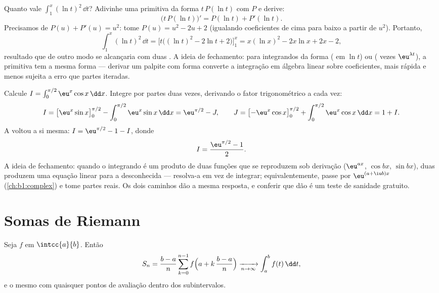 \begin{example}\label{ex:b1:integration:guessdiff}
Quanto vale $\int_1^x (\ln t)^2\,\dd t$? Adivinhe uma primitiva da
forma $t\,P(\ln t)$ com $P$  e derive:
\[
\bigl(t\,P(\ln t)\bigr)' = P(\ln t) + P'(\ln t) .
\]
Precisamos de $P(u) + P'(u) = u^2$: tome $P(u) = u^2 - 2u + 2$
(igualando coeficientes de cima para baixo a partir de $u^2$). Portanto,
\[
\int_1^x (\ln t)^2\,\dd t
= \bigl[t\bigl((\ln t)^2 - 2\ln t + 2\bigr)\bigr]_1^x
= x(\ln x)^2 - 2x\ln x + 2x - 2 ,
\]
resultado que de outro modo se alcançaria com duas . A ideia de fechamento: para integrandos da forma
( em $\ln t$) ou ( vezes $\eu^{\lambda t}$),
a primitiva tem a mesma forma --- derivar um palpite com forma
converte a integração em álgebra linear sobre coeficientes,
mais rápida e menos sujeita a erro que partes iteradas.
\end{example}

\begin{example}\label{ex:b1:integration:boomerang}
Calcule $I = \int_0^{\pi/2} \eu^x \cos x\,\dd x$. Integre por
partes duas vezes, derivando o fator trigonométrico a cada vez:
\[
I = \bigl[\eu^x \sin x\bigr]_0^{\pi/2}
- \int_0^{\pi/2} \eu^x \sin x\,\dd x
= \eu^{\pi/2} - J,
\qquad
J = \bigl[-\eu^x\cos x\bigr]_0^{\pi/2}
+ \int_0^{\pi/2} \eu^x\cos x\,\dd x = 1 + I .
\]
A  voltou a si mesma: $I = \eu^{\pi/2} - 1 - I$,
donde
\[
I = \frac{\eu^{\pi/2} - 1}{2} .
\]
A ideia de fechamento: quando o integrando é um produto de duas
funções que se reproduzem sob derivação
($\eu^{ax}$, $\cos bx$, $\sin bx$), duas 
produzem uma equação linear para a  desconhecida --- resolva-a
em vez de integrar; equivalentemente, passe por
$\eu^{(a + \iu b)x}$ (\cref{ch:b1:complex}) e tome partes
reais. Os dois caminhos dão a mesma resposta, e conferir que dão
é um teste de sanidade gratuito.
\end{example}

\section{Somas de Riemann}

\begin{theorem}\label{thm:b1:integration:riemann}
Seja $f$  em $\intcc{a}{b}$. Então
\[
S_n = \frac{b - a}{n} \sum_{k=0}^{n-1}
f\Bigl(a + k\,\frac{b-a}{n}\Bigr)
\xrightarrow[n \to \infty]{} \int_a^b f(t)\, \dd t ,
\]
e o mesmo com quaisquer pontos de avaliação dentro dos subintervalos.
\end{theorem}

